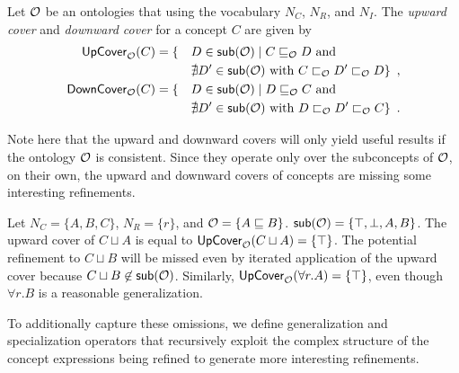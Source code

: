 \begin{definition} \label{def:alc-covers}
  Let $\mathcal{O}$ be an \ALC ontologies that using the vocabulary $N_C$, $N_R$, and $N_I$. The \emph{upward cover} and \emph{downward cover} for a concept $C$ are given by
  \begin{alignat*}{2}
    {\ensuremath{\mathsf{UpCover}}}_\mathcal{O}(C) &= \{ && D \in {\ensuremath{\mathsf{sub}}}(\mathcal{O}) \mid C \sqsubseteq_\mathcal{O} D \text{ and } \\
    &&& \nexists D' \in {\ensuremath{\mathsf{sub}}}(\mathcal{O}) \text{ with } C \sqsubset_\mathcal{O} D' \sqsubset_\mathcal{O} D \} \enspace, \\
    {\mathsf{DownCover}}_\mathcal{O}(C) &= \{ && D \in {\ensuremath{\mathsf{sub}}}(\mathcal{O}) \mid D \sqsubseteq_\mathcal{O} C \text{ and } \\
    &&& \nexists D' \in {\ensuremath{\mathsf{sub}}}(\mathcal{O}) \text{ with } D \sqsubset_\mathcal{O} D' \sqsubset_\mathcal{O} C \} \enspace.
  \end{alignat*}
\end{definition}

Note here that the upward and downward covers will only yield useful results if the ontology $\mathcal{O}$ is consistent. Since they operate only over the subconcepts of $\mathcal{O}$, on their own, the upward and downward covers of concepts are missing some interesting refinements.
\begin{example} \label{ex:up-cover-alc}
  Let $N_C = \{ A, B, C \}$, $N_R = \{ r \}$, and $\mathcal{O} = \{ A \sqsubseteq B \}$. ${\mathsf{sub}}(\mathcal{O}) = \{\top, \bot, A, B\}$. The upward cover of $C \sqcup A$ is equal to ${\mathsf{UpCover}}_\mathcal{O}(C \sqcup A) = \{ \top \}$. The potential refinement to $C \sqcup B$ will be missed even by iterated application of the upward cover because $C \sqcup B \not\in {\ensuremath{\mathsf{sub}}}(\mathcal{O})$. Similarly, ${\mathsf{UpCover}}_\mathcal{O}(\forall r.A) = \{ \top \}$, even though $\forall r.B$ is a reasonable generalization.
\end{example}

To additionally capture these omissions, we define generalization and specialization operators that recursively exploit the complex structure of the concept expressions being refined to generate more interesting refinements.

